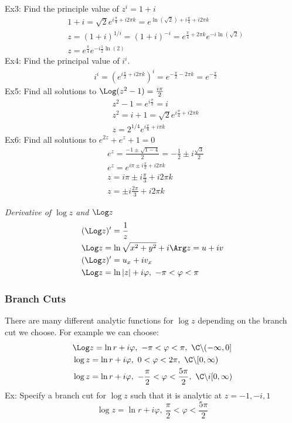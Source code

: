 Ex3: Find the principle value of $z^i=1+i$
\begin{align*}
    &1+i=\sqrt{2}e^{i\frac{\pi}{4}+i2\pi k}=e^{\ln(\sqrt{2})+i\frac{\pi}{4}+i2\pi k}\\
    &z=(1+i)^{1/i}=(1+i)^{-i}=e^{\frac{\pi}{4}+2\pi k}e^{-i\ln(\sqrt{2})}\\
    &z=e^{\frac{\pi}{4}}e^{-i\frac{1}{2}\ln(2)}
\end{align*}
Ex4: Find the principal value of $i^i$.
\begin{align*}
    &i^i=(e^{i\frac{\pi}{2}+i2\pi k})^i=e^{-\frac{\pi}{2}-2\pi k}=e^{-\frac{\pi}{2}}
\end{align*}
Ex5: Find all solutions to $\Log(z^2-1)=\frac{i\pi}{2}$
\begin{align*}
    &z^2-1=e^{i\frac{\pi}{2}}=i\\
    &z^2=i+1=\sqrt{2}e^{i\frac{\pi}{4}+i2\pi k}\\
    &z=2^{1/4}e^{i\frac{\pi}{8}+i\pi k}
\end{align*}
Ex6: Find all solutions to $e^{2z}+e^z+1=0$
\begin{align*}
    &e^z=\frac{-1\pm\sqrt{1-4}}{2}=-\frac{1}{2}\pm i\frac{\sqrt{3}}{2}\\
    &e^z=e^{i\pi\pm i\frac{\pi}{3}+i2\pi k}\\
    &z=i\pi\pm i\frac{\pi}{3}+i2\pi k\\
    &z=\pm i\frac{2\pi}{3}+i2\pi k
\end{align*}

\textit{Derivative of $\log z$ and $\Log z$}
\begin{align*}
    &(\Log z)'=\frac{1}{z}\\
    &\Log z=\ln\sqrt{x^2+y^2}+i\Arg z=u+iv\\
    &(\Log z)'=u_x+iv_x\\
    &\Log z=\ln|z|+i\varphi,\ -\pi<\varphi<\pi
\end{align*}

\subsubsection{Branch Cuts}
There are many different analytic functions for $\log z$ depending on the branch cut we choose. For example we can choose:
\begin{align*}
    &\Log z=\ln r +i\varphi,\ -\pi<\varphi<\pi,\ \C\backslash(-\infty,0]\\
    &\log z=\ln r +i\varphi,\ 0<\varphi<2\pi,\ \C\backslash[0,\infty)\\
    &\log z=\ln r +i\varphi,\ -\frac{\pi}{2}<\varphi<\frac{5\pi}{2},\ \C\backslash i[0,\infty)
\end{align*}
Ex: Specify a branch cut for $\log z$ such that it is analytic at $z=-1,-i,1$
\[\log z=\ln r+i\varphi,\ \frac{\pi}{2}<\varphi<\frac{5\pi}{2}\]

